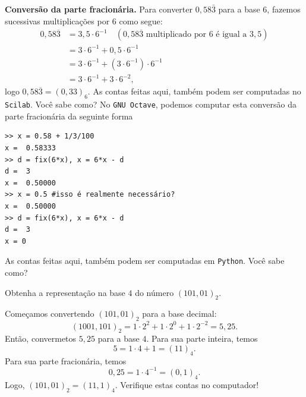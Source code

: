 \begin{resol}
{\bf Conversão da parte fracionária.} Para converter $0,58\bar{3}$ para a base $6$, fazemos sucessivas multiplicações por $6$ como segue:
  \begin{equation*}
    \begin{split}
    0,58\overline{3} &= 3,5\cdot 6^{-1}\quad(\mbox{$0,58\overline{3}$ multiplicado por $6$ é igual a $3,5$})\\
    &= 3\cdot 6^{-1} + 0,5\cdot 6^{-1}\\
    &= 3\cdot 6^{-1} + (3\cdot 6^{-1})\cdot 6^{-1}\\
    &= 3\cdot 6^{-1} + 3\cdot 6^{-2},      
    \end{split}
  \end{equation*}
logo $0,58\overline{3} = (0,33)_6$.
\ifisscilab
As contas feitas aqui, também podem ser computadas no \verb+Scilab+. Você sabe como?
\fi
\ifisoctave
No \verb+GNU Octave+, podemos computar esta conversão da parte fracionária da seguinte forma
\begin{verbatim}
>> x = 0.58 + 1/3/100
x =  0.58333
>> d = fix(6*x), x = 6*x - d
d =  3
x =  0.50000
>> x = 0.5 #isso é realmente necessário?
x =  0.50000
>> d = fix(6*x), x = 6*x - d
d =  3
x = 0
\end{verbatim}
\fi
\ifispython
As contas feitas aqui, também podem ser computadas em \verb+Python+. Você sabe como?
\fi
\end{resol}

\begin{exeresol}
  Obtenha a representação na base $4$ do número $(101,01)_2$.
\end{exeresol}
\begin{resol}
  Começamos convertendo $(101,01)_2$ para a base decimal:
  \begin{equation*}
    (1001,101)_2 = 1\cdot 2^2 + 1\cdot 2^0 + 1\cdot 2^{-2} = 5,25.
  \end{equation*}
Então, convermetos $5,25$ para a base $4$. Para sua parte inteira, temos
\begin{equation*}
  5 = 1\cdot 4 + 1 = (11)_4.
\end{equation*}
Para sua parte fracionária, temos
\begin{equation*}
  0,25 = 1\cdot 4^{-1} = (0,1)_4.
\end{equation*}
Logo, $(101,01)_2 = (11,1)_4$. Verifique estas contas no computador!
\end{resol}

